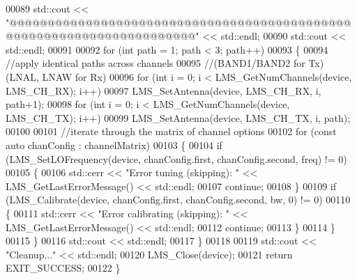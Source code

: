 \begin{DoxyCode}
00089         std::cout << \textcolor{stringliteral}{"@@@@@@@@@@@@@@@@@@@@@@@@@@@@@@@@@@@@@@@@@@@@@@@@@@@@@@@@@@@@@@@@@@@@@@"} << std::endl;
00090         std::cout << std::endl;
00091 
00092         \textcolor{keywordflow}{for} (\textcolor{keywordtype}{int} path = 1; path < 3; path++)
00093         \{
00094             \textcolor{comment}{//apply identical paths across channels}
00095             \textcolor{comment}{//(BAND1/BAND2 for Tx) (LNAL, LNAW for Rx)}
00096             \textcolor{keywordflow}{for} (\textcolor{keywordtype}{int} i = 0; i < LMS_GetNumChannels(device, LMS_CH_RX); i++)
00097                 LMS_SetAntenna(device, LMS_CH_RX, i, path+1);
00098             \textcolor{keywordflow}{for} (\textcolor{keywordtype}{int} i = 0; i < LMS_GetNumChannels(device, LMS_CH_TX); i++)
00099                 LMS_SetAntenna(device, LMS_CH_TX, i, path);
00100 
00101             \textcolor{comment}{//iterate through the matrix of channel options}
00102             \textcolor{keywordflow}{for} (\textcolor{keyword}{const} \textcolor{keyword}{auto} chanConfig : channelMatrix)
00103             \{
00104                 \textcolor{keywordflow}{if} (LMS_SetLOFrequency(device, chanConfig.first, chanConfig.second, 
      freq) != 0)
00105                 \{
00106                     std::cerr << \textcolor{stringliteral}{"Error tuning (skipping): "} << 
      LMS_GetLastErrorMessage() << std::endl;
00107                     \textcolor{keywordflow}{continue};
00108                 \}
00109                 \textcolor{keywordflow}{if} (LMS_Calibrate(device, chanConfig.first, chanConfig.second, bw, 0) != 0)
00110                 \{
00111                     std::cerr << \textcolor{stringliteral}{"Error calibrating (skipping): "} << 
      LMS_GetLastErrorMessage() << std::endl;
00112                     \textcolor{keywordflow}{continue};
00113                 \}
00114             \}
00115         \}
00116         std::cout << std::endl;
00117     \}
00118 
00119     std::cout << \textcolor{stringliteral}{"Cleanup..."} << std::endl;
00120     LMS_Close(device);
00121     \textcolor{keywordflow}{return} EXIT\_SUCCESS;
00122 \}
\end{DoxyCode}
